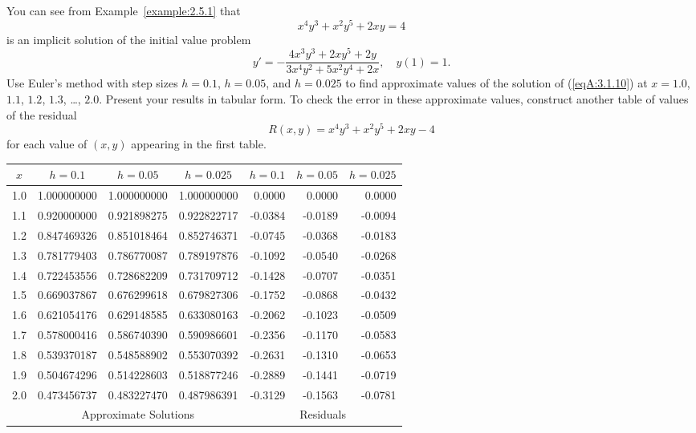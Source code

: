 \documentclass{ximera}
\begin{document}
\begin{problem}\label{exer:3.1.10} 
You can see from Example~\ref{example:2.5.1} that
$$
x^4y^3+x^2y^5+2xy=4
$$
is an implicit solution of the initial value problem
\begin{equation}\label{eqA:3.1.10}
y'=-\frac{4x^3y^3+2xy^5+2y}{3x^4y^2+5x^2y^4+2x},\quad y(1)=1.
\end{equation}
Use Euler's method with step sizes $h=0.1$, $h=0.05$, and $h=0.025$ to
find approximate values of the solution of (\ref{eqA:3.1.10}) at
$x=1.0$, $1.1$, $1.2$, $1.3$, \dots, $2.0$. Present your results in tabular form.
To check the error in these approximate values, construct another
table of values of the residual
$$
R(x,y)=x^4y^3+x^2y^5+2xy-4
$$
for each value of $(x,y)$ appearing in the first table.



\begin{solution}
    {\small
\begin{tabular}{|c|r|r|r|r|r|r|}\hline
\multicolumn{1}{|c|}{$x$}&
\multicolumn{1}{|c|}{$h=0.1$}&
\multicolumn{1}{|c|}{$h=0.05$}&
\multicolumn{1}{|c|}{$h=0.025$}&
\multicolumn{1}{|c|}{$h=0.1$}&
\multicolumn{1}{|c|}{$h=0.05$}&
\multicolumn{1}{|c|}{$h=0.025$}\\ \hline
1.0 & 1.000000000 & 1.000000000 & 1.000000000 & 0.0000 & 0.0000  &  0.0000  \\
1.1 & 0.920000000 & 0.921898275 & 0.922822717 &-0.0384 & -0.0189 & -0.0094  \\
1.2 & 0.847469326 & 0.851018464 & 0.852746371 &-0.0745 & -0.0368 & -0.0183  \\
1.3 & 0.781779403 & 0.786770087 & 0.789197876 &-0.1092 & -0.0540 & -0.0268  \\
1.4 & 0.722453556 & 0.728682209 & 0.731709712 &-0.1428 & -0.0707 & -0.0351  \\
1.5 & 0.669037867 & 0.676299618 & 0.679827306 &-0.1752 & -0.0868 & -0.0432  \\
1.6 & 0.621054176 & 0.629148585 & 0.633080163 &-0.2062 & -0.1023 & -0.0509  \\
1.7 & 0.578000416 & 0.586740390 & 0.590986601 &-0.2356 & -0.1170 & -0.0583  \\
1.8 & 0.539370187 & 0.548588902 & 0.553070392 &-0.2631 & -0.1310 & -0.0653  \\
1.9 & 0.504674296 & 0.514228603 & 0.518877246 &-0.2889 & -0.1441 & -0.0719  \\
2.0 & 0.473456737 & 0.483227470 & 0.487986391 &-0.3129 & -0.1563 & -0.0781 \\
\hline
&\multicolumn{3}{c|}{Approximate Solutions}&
\multicolumn{3}{c|}{Residuals}\\\hline
\end{tabular}}
\end{solution}
\end{problem}
\end{document}
